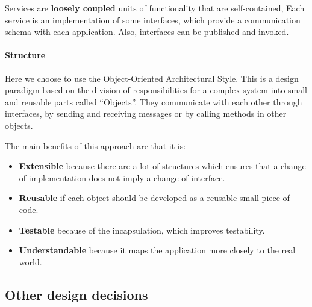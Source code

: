Services are \textbf{loosely coupled} units of functionality that are self-contained, 
Each service is an implementation of some interfaces, which provide a communication schema with
each application. Also, interfaces can be published and invoked.

\paragraph{Structure} Here we choose to use the Object-Oriented Architectural Style.
This is a design paradigm based on the division of responsibilities for a complex system
into small and reusable parts called ``Objects''.
They communicate with each other through interfaces, by sending and receiving messages
or by calling methods in other objects.

The main benefits of this approach are that it is:

\begin{itemize}
    \item{\textbf{Extensible} because there are a lot of structures which ensures that a change of implementation does not imply a change of interface.}
    \item{\textbf{Reusable} if each object should be developed as a reusable small piece of code.}
    \item{\textbf{Testable} because of the incapsulation, which improves testability.}
    \item{\textbf{Understandable} because it maps the application more closely to the real world.}
\end{itemize}

\subsection{Other design decisions}
